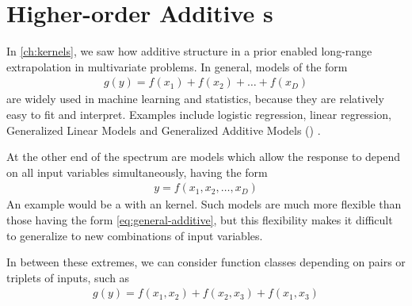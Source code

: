 
\inbpdocument



\chapter{Higher-order Additive \sgp{}s}
\label{ch:additive}



In \cref{ch:kernels}, we saw how additive structure in a \gp{} prior enabled long-range extrapolation in multivariate problems.
In general, models of the form
%
\begin{align}
g(y) = f(x_1) + f(x_2) + \dots + f(x_D)
\label{eq:general-additive}
\end{align}
%
are widely used in machine learning and statistics, because they are relatively easy to fit and interpret.
Examples include logistic regression, linear regression, Generalized Linear Models \citep{nelder1972generalized} and Generalized Additive Models (\GAM{}) \citep{hastie1990generalized}.

At the other end of the spectrum are models which allow the response to depend on all input variables simultaneously, having the form
%
\begin{align}
y = f(x_1, x_2, \dots, x_D)
\end{align}
%
An example would be a \gp{} with an \seard{} kernel.
Such models are much more flexible than those having the form \eqref{eq:general-additive}, but this flexibility makes it difficult to generalize to new combinations of input variables.

In between these extremes, we can consider function classes depending on pairs or triplets of inputs, such as
%
\begin{align}
g(y) = f(x_1, x_2) + f(x_2, x_3) + f(x_1, x_3)
\label{eq:second-order-additive}
\end{align}
%



